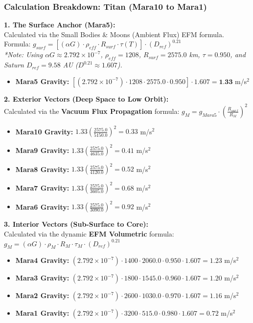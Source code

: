 \documentclass[11pt, a4paper]{article}
\begin{document}
\clearpage
\subsubsection{Calculation Breakdown: Titan (Mara10 to Mara1)}

\noindent \textbf{1. The Surface Anchor (Mara5):} \\
Calculated via the Small Bodies \& Moons (Ambient Flux) EFM formula. \\
Formula: $g_{surf} = \left[ (\alpha G) \cdot \rho_{eff} \cdot R_{surf} \cdot \tau(T) \right] \cdot (D_{ref})^{0.21}$ \\
\textit{*Note: Using $\alpha G \approx 2.792 \times 10^{-7}$, $\rho_{eff} = 1208$, $R_{surf} = 2575.0$ km, $\tau = 0.950$, and Saturn $D_{ref} = 9.58$ AU ($D^{0.21} \approx 1.607$).}
\begin{itemize}
  \item \textbf{Mara5 Gravity:} $\left[ (2.792 \times 10^{-7}) \cdot 1208 \cdot 2575.0 \cdot 0.950 \right] \cdot 1.607 = \textbf{1.33}$ m/s$^2$
\end{itemize}

\vspace{0.5em}
\noindent \textbf{2. Exterior Vectors (Deep Space to Low Orbit):} \\
Calculated via the \textbf{Vacuum Flux Propagation} formula: $g_M = g_{Mara5} \cdot \left( \frac{R_{surf}}{R_M} \right)^2$
\begin{itemize}
  \item \textbf{Mara10 Gravity:} $1.33 \left( \frac{2575.0}{5150.0} \right)^2 = 0.33$ m/s$^2$
  \item \textbf{Mara9 Gravity:} $1.33 \left( \frac{2575.0}{4635.0} \right)^2 = 0.41$ m/s$^2$
  \item \textbf{Mara8 Gravity:} $1.33 \left( \frac{2575.0}{4120.0} \right)^2 = 0.52$ m/s$^2$
  \item \textbf{Mara7 Gravity:} $1.33 \left( \frac{2575.0}{3605.0} \right)^2 = 0.68$ m/s$^2$
  \item \textbf{Mara6 Gravity:} $1.33 \left( \frac{2575.0}{3090.0} \right)^2 = 0.92$ m/s$^2$
\end{itemize}

\vspace{0.5em}
\noindent \textbf{3. Interior Vectors (Sub-Surface to Core):} \\
Calculated via the dynamic \textbf{EFM Volumetric} formula: $g_M = (\alpha G) \cdot \rho_{M} \cdot R_M \cdot \tau_M \cdot (D_{ref})^{0.21}$
\begin{itemize}
  \item \textbf{Mara4 Gravity:} $(2.792 \times 10^{-7}) \cdot 1400 \cdot 2060.0 \cdot 0.950 \cdot 1.607 = 1.23$ m/s$^2$
  \item \textbf{Mara3 Gravity:} $(2.792 \times 10^{-7}) \cdot 1800 \cdot 1545.0 \cdot 0.960 \cdot 1.607 = 1.20$ m/s$^2$
  \item \textbf{Mara2 Gravity:} $(2.792 \times 10^{-7}) \cdot 2600 \cdot 1030.0 \cdot 0.970 \cdot 1.607 = 1.16$ m/s$^2$
  \item \textbf{Mara1 Gravity:} $(2.792 \times 10^{-7}) \cdot 3200 \cdot 515.0 \cdot 0.980 \cdot 1.607 = 0.72$ m/s$^2$
\end{itemize}
\end{document}
